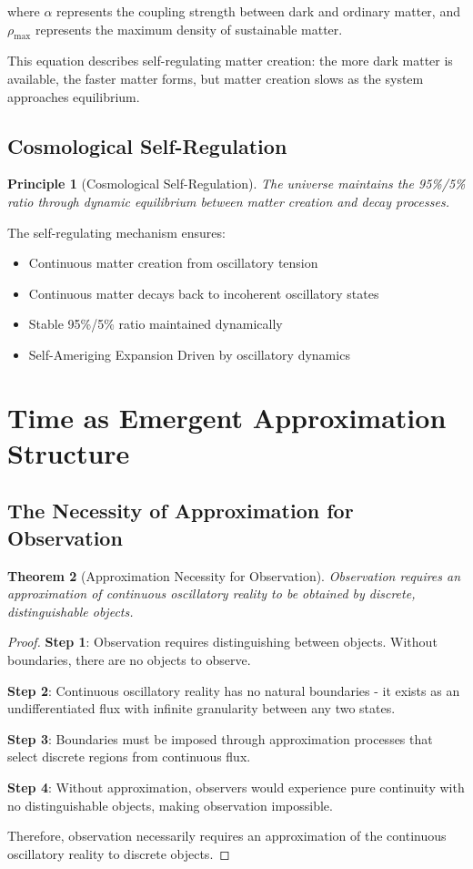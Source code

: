 \documentclass[11pt]{article}
\newtheorem{theorem}{Theorem}[section]
\newtheorem{principle}[theorem]{Principle}
\theoremstyle{remark}
\begin{document}
where $\alpha$ represents the coupling strength between dark and ordinary matter, and $\rho_{\text{max}}$ represents the maximum density of sustainable matter.

This equation describes self-regulating matter creation: the more dark matter is available, the faster matter forms, but matter creation slows as the system approaches equilibrium.

\subsection{Cosmological Self-Regulation}

\begin{principle}[Cosmological Self-Regulation]
The universe maintains the 95\%/5\% ratio through dynamic equilibrium between matter creation and decay processes.
\end{principle}

The self-regulating mechanism ensures:
\begin{itemize}
\item Continuous matter creation from oscillatory tension
\item Continuous matter decays back to incoherent oscillatory states
\item Stable 95\%/5\% ratio maintained dynamically
\item Self-Ameriging Expansion Driven by oscillatory dynamics
\end{itemize}

\section{Time as Emergent Approximation Structure}

\subsection{The Necessity of Approximation for Observation}

\begin{theorem}[Approximation Necessity for Observation]
Observation requires an approximation of continuous oscillatory reality to be obtained by discrete, distinguishable objects.
\end{theorem}

\begin{proof}
\textbf{Step 1}: Observation requires distinguishing between objects. Without boundaries, there are no objects to observe.

\textbf{Step 2}: Continuous oscillatory reality has no natural boundaries - it exists as an undifferentiated flux with infinite granularity between any two states.

\textbf{Step 3}: Boundaries must be imposed through approximation processes that select discrete regions from continuous flux.

\textbf{Step 4}: Without approximation, observers would experience pure continuity with no distinguishable objects, making observation impossible.

Therefore, observation necessarily requires an approximation of the continuous oscillatory reality to discrete objects.
\end{proof}
\end{document}

